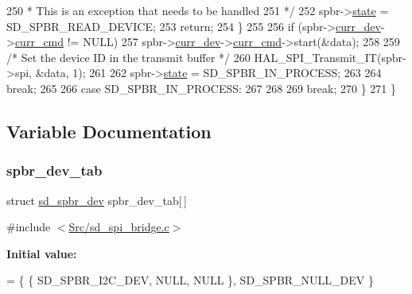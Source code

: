 \begin{DoxyCode}
{}
250 \textcolor{comment}{             * This is an exception that needs to be handled
}
251 \textcolor{comment}{             */}
252             spbr->\mbox{\hyperlink{structsd__spbr_a15ddc1ec640d62f5f08410710d83de8a}{state}} = SD\_SPBR\_READ\_DEVICE;
253             \textcolor{keywordflow}{return};
254         \}
255         
256         \textcolor{keywordflow}{if} (spbr->\mbox{\hyperlink{structsd__spbr_ab3464a17b25faba49ad79ea9c48ea46f}{curr\_dev}}->\mbox{\hyperlink{structsd__spbr__dev_a3217f31b08eb084b2c943abd2af5ca8b}{curr\_cmd}} != NULL)
257             spbr->\mbox{\hyperlink{structsd__spbr_ab3464a17b25faba49ad79ea9c48ea46f}{curr\_dev}}->\mbox{\hyperlink{structsd__spbr__dev_a3217f31b08eb084b2c943abd2af5ca8b}{curr\_cmd}}->start(&data);
258             
259         \textcolor{comment}{/* Set the device ID in the transmit buffer */}
260         HAL\_SPI\_Transmit\_IT(spbr->spi, &data, 1);
261         
262         spbr->\mbox{\hyperlink{structsd__spbr_a15ddc1ec640d62f5f08410710d83de8a}{state}} = SD\_SPBR\_IN\_PROCESS;
263     
264         \textcolor{keywordflow}{break};
265         
266     \textcolor{keywordflow}{case} SD\_SPBR\_IN\_PROCESS:
267     
268     
269         \textcolor{keywordflow}{break};
270     \}
271 \}
\end{DoxyCode}


\subsection{Variable Documentation}
\mbox{\label{group___s_d___s_p_i___bridge_ga1428a2a8c7adc3e1489417b8fe4508ba}} 
\subsubsection{\texorpdfstring{spbr\+\_\+dev\+\_\+tab}{spbr\_dev\_tab}}
{\footnotesize\ttfamily struct \mbox{\hyperlink{structsd__spbr__dev}{sd\+\_\+spbr\+\_\+dev}} spbr\+\_\+dev\+\_\+tab\mbox{[}$\,$\mbox{]}\hspace{0.3cm}{\ttfamily [static]}}



{\ttfamily \#include $<$\mbox{\hyperlink{sd__spi__bridge_8c}{Src/sd\+\_\+spi\+\_\+bridge.\+c}}$>$}

{\bfseries Initial value\+:}
\begin{DoxyCode}
= \{
    \{ SD\_SPBR\_I2C\_DEV, NULL, NULL \},
    SD\_SPBR\_NULL\_DEV
\}
\end{DoxyCode}

